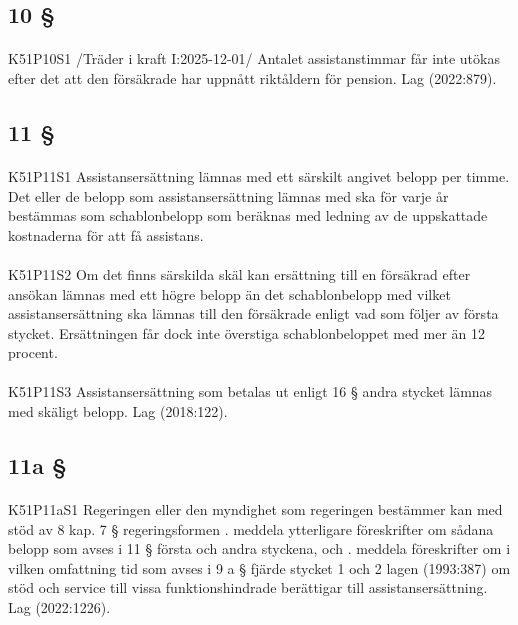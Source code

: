 \documentclass[a4paper,notitlepage,openany,10pt]{book}
\begin{document}
\subsection*{10 §}
\paragraph*{}
{\tiny K51P10S1}
/Träder i kraft I:2025-12-01/
Antalet assistanstimmar får inte utökas efter det att den försäkrade har uppnått riktåldern för pension.
Lag (2022:879).
\subsection*{11 §}
\paragraph*{}
{\tiny K51P11S1}
Assistansersättning lämnas med ett särskilt angivet belopp per timme. Det eller de belopp som assistansersättning lämnas med ska för varje år bestämmas som schablonbelopp som beräknas med ledning av de uppskattade kostnaderna för att få assistans.
\paragraph*{}
{\tiny K51P11S2}
Om det finns särskilda skäl kan ersättning till en försäkrad efter ansökan lämnas med ett högre belopp än det schablonbelopp med vilket assistansersättning ska lämnas till den försäkrade enligt vad som följer av första stycket. Ersättningen får dock inte överstiga schablonbeloppet med mer än 12 procent.
\paragraph*{}
{\tiny K51P11S3}
Assistansersättning som betalas ut enligt 16 § andra stycket lämnas med skäligt belopp.
Lag (2018:122).
\subsection*{11a §}
\paragraph*{}
{\tiny K51P11aS1}
Regeringen eller den myndighet som regeringen bestämmer kan med stöd av 8 kap. 7 § regeringsformen
. meddela ytterligare föreskrifter om sådana belopp som avses i 11 § första och andra styckena, och
. meddela föreskrifter om i vilken omfattning tid som avses i 9 a § fjärde stycket 1 och 2 lagen (1993:387) om stöd och service till vissa funktionshindrade berättigar till assistansersättning.
Lag (2022:1226).
\end{document}
